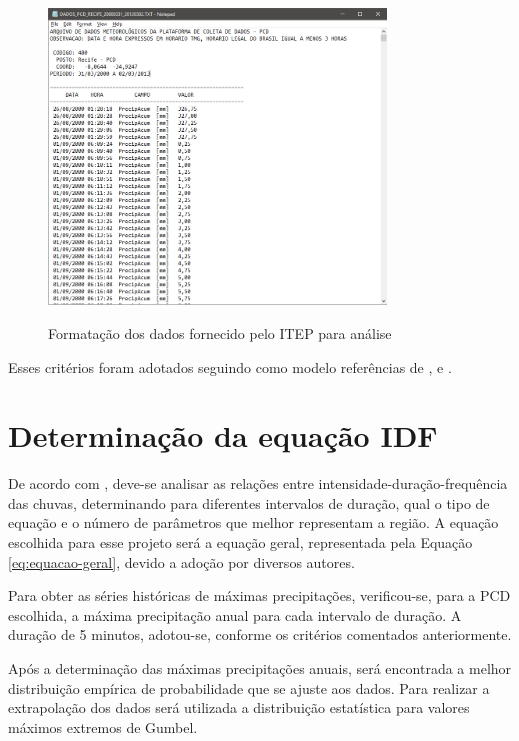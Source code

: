\begin{figure}[h]
    \caption{Formatação dos dados fornecido pelo ITEP para análise}
    \centering
    \includegraphics[width=0.8\textwidth]{Textuais/Figuras/arquivo.png}
    \label{fig:arquivo}
\end{figure}

Esses critérios foram adotados seguindo como modelo referências de ,  e .

\section{Determinação da equação IDF}

De acordo com , deve-se analisar as relações entre intensidade-duração-frequência das chuvas, determinando para diferentes intervalos de duração, qual o tipo de equação e o número de parâmetros que melhor representam a região. A equação escolhida para esse projeto será a equação geral, representada pela Equação \ref{eq:equacao-geral}, devido a adoção por diversos autores.

Para obter as séries históricas de máximas precipitações, verificou-se, para a PCD escolhida, a máxima precipitação anual para cada intervalo de duração. A duração de 5 minutos, adotou-se, conforme os critérios comentados anteriormente.

Após a determinação das máximas precipitações anuais, será encontrada a melhor distribuição empírica de probabilidade que se ajuste aos dados.
Para realizar a extrapolação dos dados será utilizada a distribuição estatística para valores máximos extremos de Gumbel.

